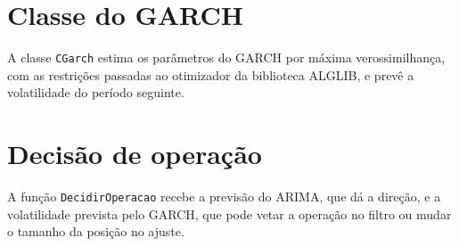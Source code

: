 

\section{Classe do GARCH}

A classe \texttt{CGarch} estima os parâmetros do GARCH por máxima
verossimilhança, com as restrições passadas ao otimizador da biblioteca ALGLIB,
e prevê a volatilidade do período seguinte.



\section{Decisão de operação}

A função \texttt{DecidirOperacao} recebe a previsão do ARIMA, que dá a direção,
e a volatilidade prevista pelo GARCH, que pode vetar a operação no filtro ou
mudar o tamanho da posição no ajuste.


